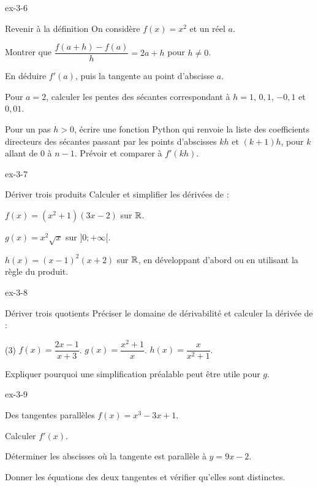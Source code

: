 \clearpage
{}
\begin{blocLivre}{ex-3-6}
\begin{exercice}[2]{Revenir à la définition}
On considère $f(x)=x^2$ et un réel $a$.
\begin{questions}
\item Montrer que $\dfrac{f(a+h)-f(a)}h=2a+h$ pour $h\neq0$.
\item En déduire $f'(a)$, puis la tangente au point d'abscisse $a$.
\item Pour $a=2$, calculer les pentes des sécantes correspondant à $h=1$, $0{,}1$, $-0{,}1$ et $0{,}01$.
\item Pour un pas $h>0$, écrire une fonction Python  qui renvoie la liste
des coefficients directeurs des sécantes passant par les points d'abscisses $kh$ et $(k+1)h$,
pour $k$ allant de 0 à $n-1$. Prévoir  et comparer à $f'(kh)$.
\end{questions}
\end{exercice}
\end{blocLivre}
\begin{blocLivre}{ex-3-7}
\begin{exercice}[2]{Dériver trois produits}
Calculer et simplifier les dérivées de :
\begin{questions}\item $f(x)=(x^2+1)(3x-2)$ sur $\mathbb{R}$.
\item $g(x)=x^2\sqrt x$ sur $]0;+\infty[$.
\item $h(x)=(x-1)^2(x+2)$ sur $\mathbb{R}$, en développant d'abord ou en utilisant la règle du produit.
\end{questions}
\end{exercice}
\end{blocLivre}
\begin{blocLivre}{ex-3-8}
\begin{exercice}[2]{Dériver trois quotients}
Préciser le domaine de dérivabilité et calculer la dérivée de :
\begin{tasks}(3)
\task $f(x)=\dfrac{2x-1}{x+3}$.
\task $g(x)=\dfrac{x^2+1}{x}$.
\task $h(x)=\dfrac{x}{x^2+1}$.
\end{tasks}
Expliquer pourquoi une simplification préalable peut être utile pour $g$.
\end{exercice}
\end{blocLivre}
\begin{blocLivre}{ex-3-9}
\begin{exercice}[2]{Des tangentes parallèles}
$f(x)=x^3-3x+1$.
\begin{questions}\item Calculer $f'(x)$.
\item Déterminer les abscisses où la tangente est parallèle à $y=9x-2$.
\item Donner les équations des deux tangentes et vérifier qu'elles sont distinctes.
\end{questions}
\end{exercice}
\end{blocLivre}
